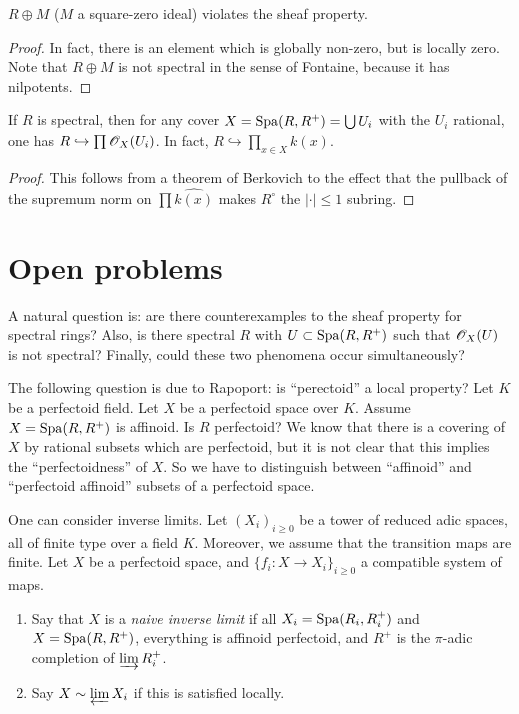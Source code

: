 \documentclass{article}
\begin{document}
\begin{theorem}
$R\oplus M$ ($M$ a square-zero ideal) violates the sheaf property. 
\end{theorem}
\begin{proof}In fact, there is an element which is globally non-zero, but is locally 
zero. Note that $R\oplus M$ is not spectral in the sense of Fontaine, because it 
has nilpotents. 
\end{proof}

\begin{proposition}
If $R$ is spectral, then for any cover $X=\operatorname{Spa}(R,R^+) = \bigcup U_i$ with the 
$U_i$ rational, one has 
$R\hookrightarrow \prod\mathscr{O}_X(U_i)$. In fact, 
$R\hookrightarrow \prod_{x\in X} \widehat{k(x)}$. 
\end{proposition}
\begin{proof}
This follows from a theorem of Berkovich to the effect that the pullback of the 
supremum norm on $\prod \widehat{k(x)}$ makes $R^\circ$ the $|\cdot|\leqslant 1$ 
subring. 
\end{proof}





\section{Open problems}

A natural question is: are there counterexamples to the sheaf property for 
spectral rings? Also, is there spectral $R$ with $U\subset \operatorname{Spa}(R,R^+)$ such that 
$\mathscr{O}_X(U)$ is not spectral? Finally, could these two phenomena occur simultaneously?

The following question is due to Rapoport: is ``perectoid'' a local property? Let 
$K$ be a perfectoid field. Let $X$ be a perfectoid space over $K$. Assume 
$X=\operatorname{Spa}(R,R^+)$ is affinoid. Is $R$ perfectoid? We know that there is a covering 
of $X$ by rational subsets which are perfectoid, but it is not clear that this 
implies the ``perfectoidness'' of $X$. So we have to distinguish between 
``affinoid'' and ``perfectoid affinoid'' subsets of a perfectoid space. 

One can consider inverse limits. Let $(X_i)_{i\geqslant 0}$ be a 
tower of reduced adic spaces, all of finite type over a field $K$. Moreover, we 
assume that the transition maps are finite. Let $X$ be a perfectoid space, and 
$\{f_i:X\to X_i\}_{i\geqslant 0}$ a compatible system of maps. 

\begin{definition}
\begin{enumerate}
  \item Say that $X$ is a \emph{naive inverse limit} if all $X_i=\operatorname{Spa}(R_i,R_i^+)$ 
    and $X=\operatorname{Spa}(R,R^+)$, everything is affinoid perfectoid, and 
    $R^+$ is the $\pi$-adic completion of $\varinjlim R_i^+$. 
  \item Say $X\sim \varprojlim X_i$ if this is satisfied locally. 
\end{enumerate}
\end{definition}
\end{document}
